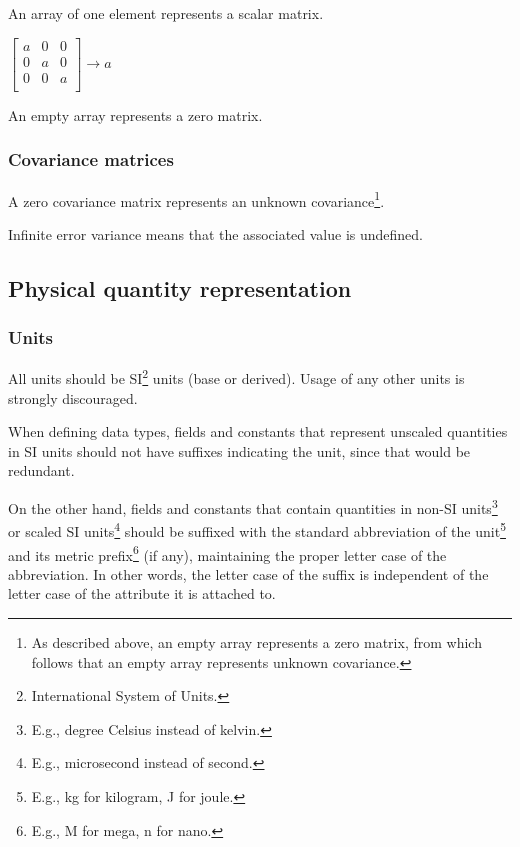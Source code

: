 An array of one element represents a scalar matrix.
\begin{remark}
    $
    \begin{bmatrix}
        a & 0 & 0 \\
        0 & a & 0 \\
        0 & 0 & a \\
    \end{bmatrix} \rightarrow a
    $
\end{remark}

An empty array represents a zero matrix.

\subsubsection{Covariance matrices}

A zero covariance matrix represents an unknown covariance\footnote{%
    As described above, an empty array represents a zero matrix,
    from which follows that an empty array represents unknown covariance.
}.

Infinite error variance means that the associated value is undefined.

\subsection{Physical quantity representation}

\subsubsection{Units}

All units should be SI\footnote{International System of Units.} units (base or derived).
Usage of any other units is strongly discouraged.

When defining data types, fields and constants that represent unscaled quantities in SI units
should not have suffixes indicating the unit, since that would be redundant.

On the other hand, fields and constants that contain quantities in
non-SI units\footnote{E.g., degree Celsius instead of kelvin.}
or scaled SI units\footnote{E.g., microsecond instead of second.}
should be suffixed with the standard abbreviation of the unit\footnote{E.g., kg for kilogram, J for joule.}
and its metric prefix\footnote{E.g., M for mega, n for nano.}
(if any), maintaining the proper letter case of the abbreviation.
In other words, the letter case of the suffix is independent of the letter case of
the attribute it is attached to.

